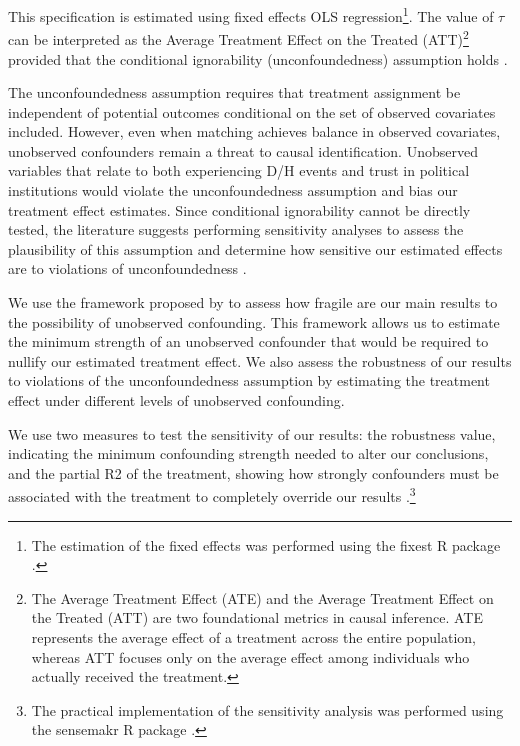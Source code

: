 \documentclass{article}
\begin{document}
This specification is estimated using fixed effects OLS regression\footnote{The estimation of the fixed effects was performed using the fixest R package \parencite{berge_efficient_2018}.}. The value of \( \tau \) can be interpreted as the Average Treatment Effect on the Treated (ATT)\footnote{The Average Treatment Effect (ATE) and the Average Treatment Effect on the Treated (ATT) are two foundational metrics in causal inference. ATE represents the average effect of a treatment across the entire population, whereas ATT focuses only on the average effect among individuals who actually received the treatment.} provided that the conditional ignorability (unconfoundedness) assumption holds \parencite{abadie_econometric_2018, greifer_matching_2021}.

The unconfoundedness assumption requires that treatment assignment be independent of potential outcomes conditional on the set of observed covariates included. However, even when matching achieves balance in observed covariates, unobserved confounders remain a threat to causal identification. Unobserved variables that relate to both experiencing D/H events and trust in political institutions would violate the unconfoundedness assumption and bias our treatment effect estimates. Since conditional ignorability cannot be directly tested, the literature suggests performing sensitivity analyses to assess the plausibility of this assumption and determine how sensitive our estimated effects are to violations of unconfoundedness \parencite{stuart_matching_2010}.

We use the framework proposed by \textcite{cinelli_making_2020} to assess how fragile are our main results to the possibility of unobserved confounding. This framework allows us to estimate the minimum strength of an unobserved confounder that would be required to nullify our estimated treatment effect. We also assess the robustness of our results to violations of the unconfoundedness assumption by estimating the treatment effect under different levels of unobserved confounding.

We use two measures to test the sensitivity of our results: the robustness value, indicating the minimum confounding strength needed to alter our conclusions, and the partial R2 of the treatment, showing how strongly confounders must be associated with the treatment to completely override our results \parencite{cinelli_making_2020}.\footnote{The practical implementation of the sensitivity analysis was performed using the sensemakr R package \parencite{cinelli_sensemakr_2024}.}
\end{document}
